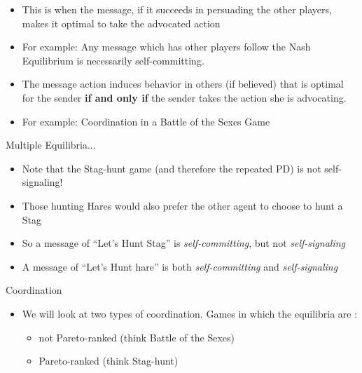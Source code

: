 \documentclass{beamer}
\begin{document}
\begin{frame}
\begin{card}
		\begin{itemize}
			\item This is when the message, if it succeeds in persuading the other players, makes it optimal to take the advocated action
			\item For example: Any message which has other players follow the Nash Equilibrium is necessarily self-committing.
		\end{itemize}
\end{card}
\end{frame}

\begin{frame}
\begin{card}
		\begin{itemize}
			\item The message action induces behavior in others (if believed) that is optimal for the sender \textbf{if and only if} the sender takes the action she is advocating.
			\item For example: Coordination in a Battle of the Sexes Game 
		\end{itemize}
\end{card}
\end{frame}

\begin{frame}{Multiple Equilibria...}
    \begin{card}
    	\begin{itemize}
    		\item Note that the Stag-hunt game (and therefore the repeated PD) is not self-signaling!
    		\item Those hunting Hares would also prefer the other agent to choose to hunt a Stag
    		\item So a message of ``Let's Hunt Stag'' is \emph{self-committing}, but not \emph{self-signaling}
    		\item A message of ``Let's Hunt hare'' is both \emph{self-committing} and \emph{self-signaling}
    	\end{itemize}
    \end{card}
\end{frame}

\begin{frame}{Coordination}
	\begin{itemize}
		\item We will look at two types of coordination. Games in which the equilibria are :
		\begin{itemize}
			\item not Pareto-ranked (think Battle of the Sexes)
			\item Pareto-ranked (think Stag-hunt)
		\end{itemize}
	\end{itemize}
\end{frame}
\end{document}
